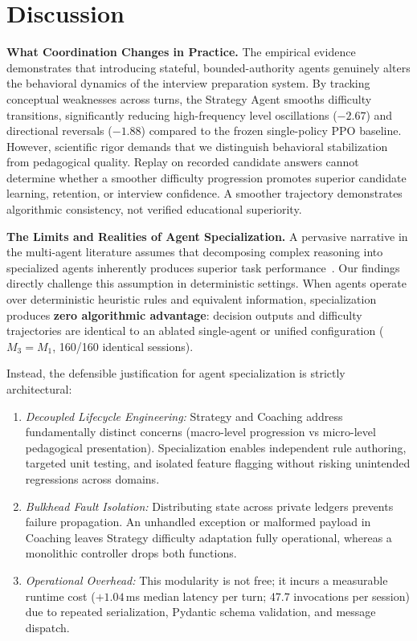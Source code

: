 \section{Discussion}\label{sec:disc}

\noindent\textbf{What Coordination Changes in Practice.} The empirical evidence demonstrates that introducing stateful, bounded-authority agents genuinely alters the behavioral dynamics of the interview preparation system. By tracking conceptual weaknesses across turns, the Strategy Agent smooths difficulty transitions, significantly reducing high-frequency level oscillations ($-2.67$) and directional reversals ($-1.88$) compared to the frozen single-policy PPO baseline. However, scientific rigor demands that we distinguish behavioral stabilization from pedagogical quality. Replay on recorded candidate answers cannot determine whether a smoother difficulty progression promotes superior candidate learning, retention, or interview confidence. A smoother trajectory demonstrates algorithmic consistency, not verified educational superiority.

\noindent\textbf{The Limits and Realities of Agent Specialization.} A pervasive narrative in the multi-agent literature assumes that decomposing complex reasoning into specialized agents inherently produces superior task performance~\cite{autogen,metagpt}. Our findings directly challenge this assumption in deterministic settings. When agents operate over deterministic heuristic rules and equivalent information, specialization produces \textbf{zero algorithmic advantage}: decision outputs and difficulty trajectories are identical to an ablated single-agent or unified configuration ($M_3 = M_1$, 160/160 identical sessions). 

Instead, the defensible justification for agent specialization is strictly architectural:
\begin{enumerate}
\item \emph{Decoupled Lifecycle Engineering:} Strategy and Coaching address fundamentally distinct concerns (macro-level progression vs micro-level pedagogical presentation). Specialization enables independent rule authoring, targeted unit testing, and isolated feature flagging without risking unintended regressions across domains.
\item \emph{Bulkhead Fault Isolation:} Distributing state across private ledgers prevents failure propagation. An unhandled exception or malformed payload in Coaching leaves Strategy difficulty adaptation fully operational, whereas a monolithic controller drops both functions.
\item \emph{Operational Overhead:} This modularity is not free; it incurs a measurable runtime cost ($+1.04$\,ms median latency per turn; 47.7 invocations per session) due to repeated serialization, Pydantic schema validation, and message dispatch.
\end{enumerate}

